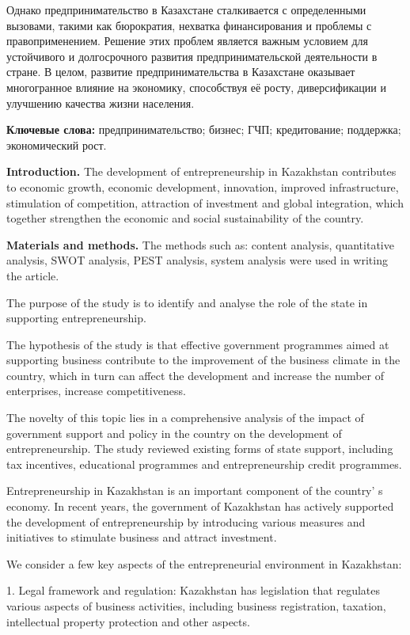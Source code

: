 Однако предпринимательство в Казахстане сталкивается с определенными
вызовами, такими как бюрократия, нехватка финансирования и проблемы с
правоприменением. Решение этих проблем является важным условием для
устойчивого и долгосрочного развития предпринимательской деятельности в
стране. В целом, развитие предпринимательства в Казахстане оказывает
многогранное влияние на экономику, способствуя её росту, диверсификации
и улучшению качества жизни населения.

{\bfseries Ключевые слова:} предпринимательство; бизнес; ГЧП; кредитование;
поддержка; экономический рост.

\begin{multicols}{2}
{\bfseries Introduction.} The development of entrepreneurship in Kazakhstan
contributes to economic growth, economic development, innovation,
improved infrastructure, stimulation of competition, attraction of
investment and global integration, which together strengthen the
economic and social sustainability of the country.

{\bfseries Materials and methods.} The methods such as: content analysis,
quantitative analysis, SWOT analysis, PEST analysis, system analysis
were used in writing the article.

The purpose of the study is to identify and analyse the role of the
state in supporting entrepreneurship.

The hypothesis of the study is that effective government programmes
aimed at supporting business contribute to the improvement of the
business climate in the country, which in turn can affect the
development and increase the number of enterprises, increase
competitiveness.

The novelty of this topic lies in a comprehensive analysis of the impact
of government support and policy in the country on the development of
entrepreneurship. The study reviewed existing forms of state support,
including tax incentives, educational programmes and entrepreneurship
credit programmes.

Entrepreneurship in Kazakhstan is an important component of the
country' s economy. In recent years, the government of
Kazakhstan has actively supported the development of entrepreneurship by
introducing various measures and initiatives to stimulate business and
attract investment.

We consider a few key aspects of the entrepreneurial environment in
Kazakhstan:

1. Legal framework and regulation: Kazakhstan has legislation that
regulates various aspects of business activities, including business
registration, taxation, intellectual property protection and other
aspects.


\end{multicols}
